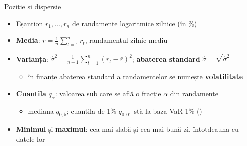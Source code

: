 \begin{frame}{Poziție și dispersie}
\itemsize{\small}
\begin{itemize}
    \item Eșantion $r_1, \dots, r_n$ de randamente logaritmice zilnice (în \%)
    \item \textbf{Media}: $\bar r = \frac1n \sum_{t=1}^{n} r_t$, randamentul zilnic mediu
    \item \textbf{Varianța}: $\hat\sigma^2 = \frac{1}{n-1} \sum_{t=1}^{n} (r_t - \bar r)^2$; \textbf{abaterea standard} $\hat\sigma = \sqrt{\hat\sigma^2}$
    \begin{itemize}
        \item în finanțe abaterea standard a randamentelor se numește \textbf{volatilitate}
    \end{itemize}
    \item \textbf{Cuantila} $q_\alpha$: valoarea sub care se află o fracție $\alpha$ din randamente
    \begin{itemize}
        \item mediana $q_{0{,}5}$; cuantila de 1\% $q_{0{,}01}$ stă la baza VaR 1\% ()
    \end{itemize}
    \item \textbf{Minimul} și \textbf{maximul}: cea mai slabă și cea mai bună zi, întotdeauna cu datele lor
\end{itemize}
\end{frame}

